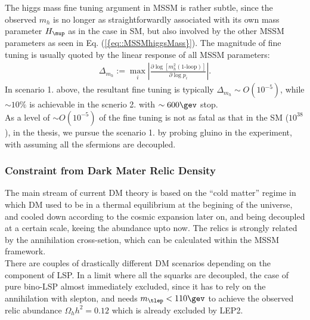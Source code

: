 The higgs mass fine tuning argument in MSSM is rather subtle, since the observed $m_{h}$ is no longer 
as straightforwardly associated with its own mass parameter $H_\mup$ as in the case in SM, but also involved by the other MSSM parameters as seen in Eq. (\ref{{eq::MSSMhiggsMass}}).
The magnitude of fine tuning is usually quoted by the linear response of all MSSM parameters:
\begin{align}
\Delta_{m_{h}} := \max_i \left|  \frac{\partial \log [m^2_h (\mbox{1-loop})] }{\partial \log{p_i}} \right|.
\end{align}
In scenario 1. above, the resultant fine tuning is typically $\Delta_{m_{h}} \sim O(10^{-5})$, while $\sim 10\%$ is achievable in the scnerio 2. with $\sim 600\gev$ stop.  \\
%
As a level of $\sim O(10^{-5})$ of the fine tuning is not as fatal as that in the SM ($10^{38}$),
in the thesis, we pursue the scenario 1. by probing gluino in the experiment, with assuming all the sfermions are decoupled.
%


\subsubsection{Constraint from Dark Mater Relic Density} \label{sec::Introduction::DMconstraint}
The main stream of current DM theory is based on the ``cold matter'' regime in which DM used to be in a thermal equilibrium at the begining of the universe, and cooled down according to the cosmic expansion later on, and being decoupled at a certain scale, keeing the abundance upto now. The relics is strongly related by the annihilation cross-setion, which can be calculated within the MSSM framework. \\

There are couples of drastically different DM scenarios depending on the component of LSP.
In a limit where all the squarks are decoupled, the case of pure bino-LSP almost immediately excluded, since it has to rely on the annihilation with slepton, 
and needs $m_{\tlep}<110\gev$ to achieve the observed relic abundance $\Omega_h h^2= 0.12$ which is already excluded by LEP2. \\

